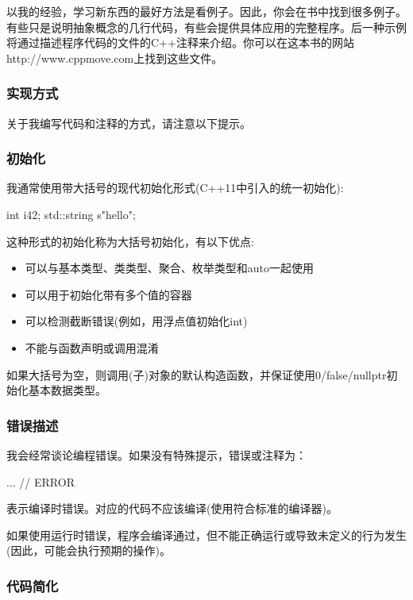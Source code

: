 以我的经验，学习新东西的最好方法是看例子。因此，你会在书中找到很多例子。有些只是说明抽象概念的几行代码，有些会提供具体应用的完整程序。后一种示例将通过描述程序代码的文件的C++注释来介绍。你可以在这本书的网站http://www.cppmove.com上找到这些文件。

\subsubsection{实现方式}

关于我编写代码和注释的方式，请注意以下提示。

\subsubsection{初始化}

我通常使用带大括号的现代初始化形式(C++11中引入的统一初始化):
\begin{cppcode}
int i{42};
std::string s{"hello"};
\end{cppcode}

这种形式的初始化称为大括号初始化，有以下优点:
\begin{itemize}
	\item 可以与基本类型、类类型、聚合、枚举类型和auto一起使用
	\item 可以用于初始化带有多个值的容器
	\item 可以检测截断错误(例如，用浮点值初始化int)
	\item 不能与函数声明或调用混淆
\end{itemize}

如果大括号为空，则调用(子)对象的默认构造函数，并保证使用0/false/nullptr初始化基本数据类型。

\subsubsection{错误描述}

我会经常谈论编程错误。如果没有特殊提示，错误或注释为：

\begin{cppcode}
... // ERROR
\end{cppcode}

表示编译时错误。对应的代码不应该编译(使用符合标准的编译器)。

如果使用运行时错误，程序会编译通过，但不能正确运行或导致未定义的行为发生(因此，可能会执行预期的操作)。

\subsubsection{代码简化}

